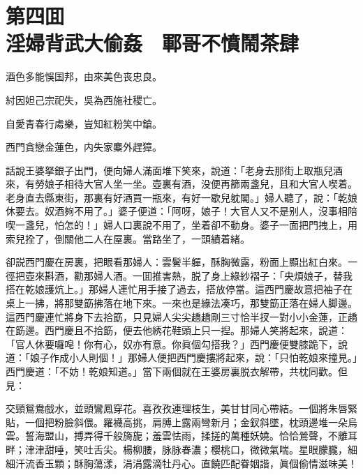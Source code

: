 
\chapter*{第四囬　\\淫婦背武大偷姦　鄆哥不憤鬧茶肆}


\begin{myquote}
酒色多能悞国邦，由來美色丧忠良。

紂因妲己宗祀失，吳為西施社稷亡。

自愛青春行䖏樂，豈知紅粉笑中鎗。

西門貪戀金蓮色，内失家麋外趕獐。
\end{myquote}

話說王婆拏銀子出門，便向婦人滿面堆下笑來，說道：「老身去那街上取瓶兒酒來，有勞娘子相待大官人坐一坐。壺裏有酒，没便再篩兩盞兒，且和大官人喫着。老身直去縣東街，那裏有好酒買一瓶來，有好一歇兒躭閣。」婦人聽了，說：「乾娘休要去。奴酒夠不用了。」婆子便道：「阿呀，娘子！大官人又不是别人，沒事相陪喫一盞兒，怕怎的！」婦人口裏說不用了，坐着卻不動身。婆子一面把門拽上，用索兒拴了，倒關他二人在屋裏。當路坐了，一頭績着緒。

卻説西門慶在房裏，把眼看那婦人：雲鬢半軃，酥胸微露，粉面上顯出紅白來。一徑把壺來斟酒，勸那婦人酒。一囬推害熱，脱了身上綠紗褶子：「央煩娘子，替我搭在乾娘護炕上。」那婦人連忙用手接了過去，搭放停當。這西門慶故意把袖子在桌上一拂，將那雙筯拂落在地下來。一來也是緣法凑巧，那雙筯正落在婦人脚邊。這西門慶連忙將身下去拾筯，只見婦人尖尖趫趫剛三寸恰半扠一對小小金蓮，正趫在筯邊。西門慶且不拾筯，便去他綉花鞋頭上只一揑。那婦人笑將起來，說道：「官人休要囉唣！你有心，奴亦有意。你眞個勾搭我？」西門慶便雙膝跪下，說道：「娘子作成小人則個！」那婦人便把西門慶摟將起來，說：「只怕乾娘來撞見。」西門慶道：「不妨！乾娘知道。」當下兩個就在王婆房裏脱衣解帶，共枕同歡。但見：

\begin{myquote}
交頸鴛鴦戲水，並頭鸞鳳穿花。喜孜孜連理枝生，美甘甘同心帶結。一個將朱唇緊貼，一個把粉臉斜偎。羅襪高挑，肩膊上露兩彎新月；金釵斜墜，枕頭邊堆一朵烏雲。誓海盟山，搏弄得千般旖旎；羞雲怯雨，揉搓的萬種妖嬈。恰恰鶯聲，不離耳畔；津津甜唾，笑吐舌尖。楊柳腰，脉脉春濃；櫻桃口，微微氣喘。星眼朦朧，細細汗流香玉顆；酥胸蕩漾，涓涓露滴牡丹心。直饒匹配眷姻諧，眞個偷情滋味美！
\end{myquote}

